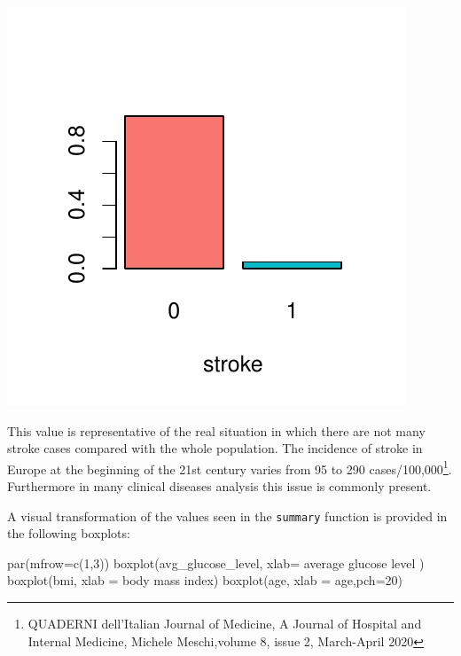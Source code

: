 \documentclass[
]{article}
\newenvironment{Shaded}{\begin{snugshade}}{\end{snugshade}}
\newcommand{\AttributeTok}[1]{\textcolor[rgb]{0.77,0.63,0.00}{#1}}
\newcommand{\DecValTok}[1]{\textcolor[rgb]{0.00,0.00,0.81}{#1}}
\newcommand{\FunctionTok}[1]{\textcolor[rgb]{0.00,0.00,0.00}{#1}}
\newcommand{\NormalTok}[1]{#1}
\newcommand{\StringTok}[1]{\textcolor[rgb]{0.31,0.60,0.02}{#1}}
\begin{document}
\begin{center}\includegraphics{stat-project-stroke_files/figure-latex/unnamed-chunk-7-1} \end{center}

This value is representative of the real situation in which there are
not many stroke cases compared with the whole population. The incidence
of stroke in Europe at the beginning of the 21st century varies from 95
to 290 cases/100,000\footnote{QUADERNI dell'Italian Journal of Medicine,
  A Journal of Hospital and Internal Medicine, Michele Meschi,volume 8,
  issue 2, March-April 2020}. Furthermore in many clinical diseases
analysis this issue is commonly present.

A visual transformation of the values seen in the \texttt{summary}
function is provided in the following boxplots:

\begin{Shaded}
\begin{Highlighting}[]
\FunctionTok{par}\NormalTok{(}\AttributeTok{mfrow=}\FunctionTok{c}\NormalTok{(}\DecValTok{1}\NormalTok{,}\DecValTok{3}\NormalTok{))}
\FunctionTok{boxplot}\NormalTok{(avg\_glucose\_level, }\AttributeTok{xlab=} \StringTok{\textquotesingle{}average glucose level\textquotesingle{}}\NormalTok{ )}
\FunctionTok{boxplot}\NormalTok{(bmi, }\AttributeTok{xlab =} \StringTok{\textquotesingle{}body mass index\textquotesingle{}}\NormalTok{)}
\FunctionTok{boxplot}\NormalTok{(age, }\AttributeTok{xlab =} \StringTok{\textquotesingle{}age\textquotesingle{}}\NormalTok{,}\AttributeTok{pch=}\DecValTok{20}\NormalTok{)}
\end{Highlighting}
\end{Shaded}
\end{document}
